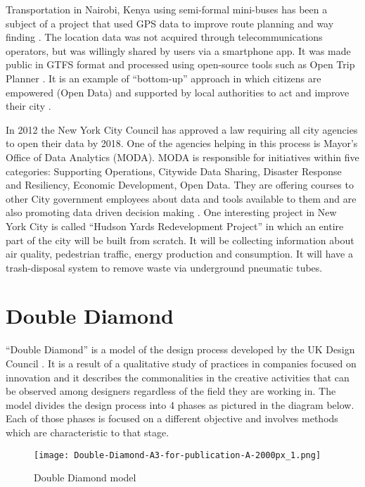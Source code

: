 Transportation in Nairobi, Kenya using semi-formal mini-buses has been a subject of a project that used GPS data to improve route planning and way finding \citep{klopp2015leveraging}. The location data was not acquired through telecommunications operators, but was willingly shared by users via a smartphone app. It was made public in GTFS format and processed using open-source tools such as Open Trip Planner \citep{klopp2015leveraging}. It is an example of “bottom-up” approach in which citizens are empowered (Open Data) and supported by local authorities to act and improve their city \citep{Neirotti2014}.

In 2012 the New York City Council has approved a law requiring all city agencies to open their data by 2018. One of the agencies helping in this process is Mayor’s Office of Data Analytics (MODA). MODA is responsible for initiatives within five categories: Supporting Operations, Citywide Data Sharing, Disaster Response and Resiliency, Economic Development, Open Data. They are offering courses to other City government employees about data and tools available to them and are also promoting data driven decision making \citep{NYCMODA2014}. One interesting project in New York City is called “Hudson Yards Redevelopment Project” in which an entire part of the city will be built from scratch. It will be collecting information about air quality, pedestrian traffic, energy production and consumption. It will have a trash-disposal system to remove waste via underground pneumatic tubes.

	\section{Double Diamond}
	
“Double Diamond” is a model of the design process developed by the UK Design Council \citep{council2007eleven, council2005double}. It is a result of a qualitative study of practices in companies focused on innovation and it describes the commonalities in the creative activities that can be observed among designers regardless of the field they are working in. The model divides the design process into 4 phases as pictured in the diagram below. Each of those phases is focused on a different objective and involves methods which are characteristic to that stage.

\begin{figure}[h]
\centering
     \texttt{[image: Double-Diamond-A3-for-publication-A-2000px\_1.png]}
      \caption{Double Diamond model \citep{council2005double} }
       \label{normal_case}
\end{figure}

